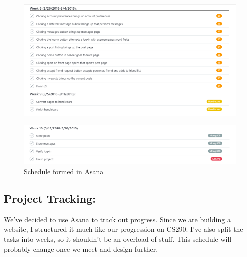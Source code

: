 \documentclass[a4paper]{article}
\begin{document}
\begin{figure}[!ht]
  \centering
		\includegraphics[width=1\textwidth]{images/sched4.png}
    \label{fig:sched4}
\end{figure}
\begin{figure}[!ht]
  \centering
		\includegraphics[width=1\textwidth]{images/sched5.png}
        \caption{Schedule formed in Asana}
    \label{fig:sched5}
\end{figure}
\newpage
\begin{flushleft}
\subsection{Project Tracking:} We’ve decided to use Asana to track out progress. Since we are building a website, I structured it much like our progression on CS290. I’ve also split the tasks into weeks, so it shouldn’t be an overload of stuff. This schedule will probably change once we meet and design further.
\end{flushleft}
\end{document}
